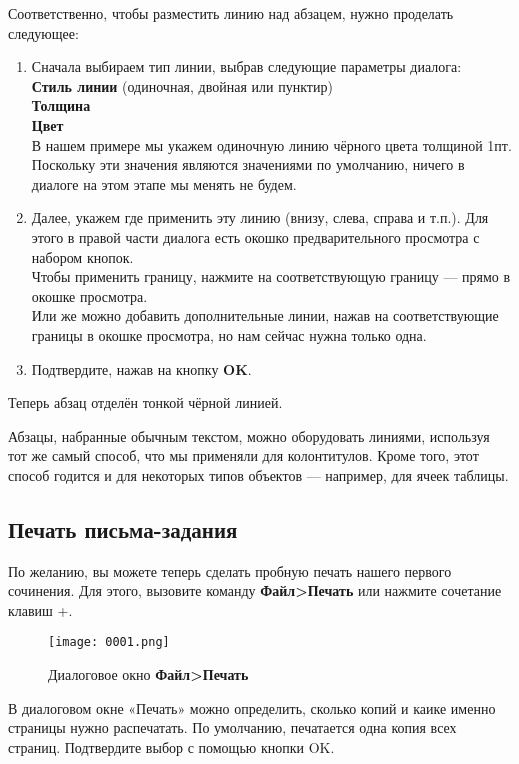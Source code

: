 \documentclass[a4paper,10pt]{article}
\begin{document}
Соответственно, чтобы разместить линию над абзацем, нужно проделать следующее:
\begin{enumerate}
 \item Сначала выбираем тип линии, выбрав следующие параметры диалога:\\
\textbf{Стиль линии} (одиночная, двойная или пунктир)\\
\textbf{Толщина}\\
\textbf{Цвет}\\
В нашем примере мы укажем одиночную линию чёрного цвета толщиной 1пт.\\
Поскольку эти значения являются значениями по умолчанию, ничего в диалоге на этом этапе мы менять не будем.
\item Далее, укажем где применить эту линию (внизу, слева, справа и т.п.). Для этого в правой части диалога есть окошко предварительного просмотра с набором кнопок.\\
Чтобы применить границу, нажмите на соответствующую границу — прямо в окошке просмотра.\\
Или же можно добавить дополнительные линии, нажав на соответствующие границы в окошке просмотра, но нам сейчас нужна только одна.
\item Подтвердите, нажав на кнопку \textbf{OK}.
\end{enumerate}

Теперь абзац отделён тонкой чёрной линией.

Абзацы, набранные обычным текстом, можно оборудовать линиями, используя тот же самый способ, что мы применяли для колонтитулов. Кроме того, этот способ годится и для некоторых типов объектов — например, для ячеек таблицы.

\subsection{Печать письма-задания}
По желанию, вы можете теперь сделать пробную печать нашего первого сочинения. Для этого, вызовите команду \textbf{Файл>Печать} или нажмите сочетание клавиш +.

\begin{figure}[ht]
\texttt{[image: 0001.png]}
\centering
\caption{Диалоговое окно \textbf{Файл>Печать}}
\end{figure}

В диалоговом окне «Печать» можно определить, сколько копий и каике именно страницы нужно распечатать. По умолчанию, печатается одна копия всех страниц. Подтвердите выбор с помощью кнопки OK. 
\end{document}
